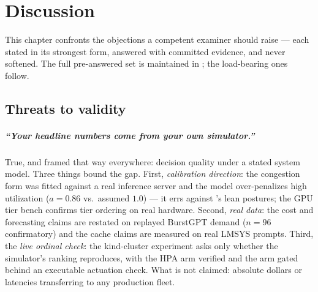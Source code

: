 \chapter{Discussion}
\label{ch:discussion}

This chapter confronts the objections a competent examiner should raise ---
each stated in its strongest form, answered with committed evidence, and
never softened. The full pre-answered set is maintained in
; the load-bearing ones follow.

\section{Threats to validity}
\label{sec:disc-validity}

\paragraph{``Your headline numbers come from your own simulator.''}
True, and framed that way everywhere: decision quality under a stated system
model. Three things bound the gap. First, \emph{calibration direction}: the
congestion form was fitted against a real inference server and the model
over-penalizes high utilization ($a{=}0.86$ vs.\ assumed $1.0$) --- it errs
against \polyforge{}'s lean postures; the GPU tier bench confirms tier
ordering on real hardware. Second, \emph{real data}: the cost and
forecasting claims are restated on replayed BurstGPT demand ($n{=}96$
confirmatory) and the cache claims are measured on real LMSYS prompts.
Third, the \emph{live ordinal check}: the kind-cluster experiment asks only
whether the simulator's ranking reproduces, with the HPA arm verified and
the \jcac{} arm gated behind an executable actuation check. What is not
claimed: absolute dollars or latencies transferring to any production
fleet.

